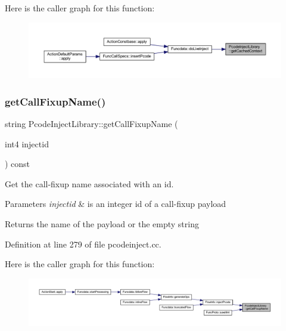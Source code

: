 Here is the caller graph for this function\+:
\nopagebreak
\begin{figure}[H]
\begin{center}
\leavevmode
\includegraphics[width=350pt]{class_pcode_inject_library_a3a1ca9f7ea2cea02de1141cc35c79b18_icgraph}
\end{center}
\end{figure}
\mbox{\label{class_pcode_inject_library_a436ac8db6c2f5735481c86a937d3db55}} 
\subsubsection{\texorpdfstring{getCallFixupName()}{getCallFixupName()}}
{\footnotesize\ttfamily string Pcode\+Inject\+Library\+::get\+Call\+Fixup\+Name (\begin{DoxyParamCaption}\item[{int4}]{injectid }\end{DoxyParamCaption}) const}



Get the call-\/fixup name associated with an id. 


\begin{DoxyParams}{Parameters}
{\em injectid} & is an integer id of a call-\/fixup payload \\
\hline
\end{DoxyParams}
\begin{DoxyReturn}{Returns}
the name of the payload or the empty string 
\end{DoxyReturn}


Definition at line 279 of file pcodeinject.\+cc.

Here is the caller graph for this function\+:
\nopagebreak
\begin{figure}[H]
\begin{center}
\leavevmode
\includegraphics[width=350pt]{class_pcode_inject_library_a436ac8db6c2f5735481c86a937d3db55_icgraph}
\end{center}
\end{figure}
\mbox{\label{class_pcode_inject_library_aaf5cb3c65ea01b0db1d38777f23b8796}} 
